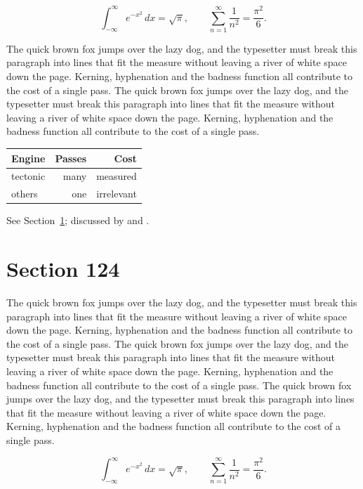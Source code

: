 \documentclass{article}
\begin{document}
\begin{equation}\label{eq:123}
\int_{-\infty}^{\infty} e^{-x^{2}}\,dx = \sqrt{\pi}, \qquad
\sum_{n=1}^{\infty} \frac{1}{n^{2}} = \frac{\pi^{2}}{6}.
\end{equation}

The quick brown fox jumps over the lazy dog, and the typesetter must break this paragraph into lines that fit the measure without leaving a river of white space down the page. Kerning, hyphenation and the badness function all contribute to the cost of a single pass. The quick brown fox jumps over the lazy dog, and the typesetter must break this paragraph into lines that fit the measure without leaving a river of white space down the page. Kerning, hyphenation and the badness function all contribute to the cost of a single pass. 

\begin{center}
\begin{tabular}{lrr}
\toprule
Engine & Passes & Cost \\
\midrule
tectonic & many & measured \\
others & one & irrelevant \\
\bottomrule
\end{tabular}
\end{center}

See Section~\ref{sec:124}; discussed by \textcite{k4} and \textcite{l1}.
\section{Section 124}
\label{sec:124}
The quick brown fox jumps over the lazy dog, and the typesetter must break this paragraph into lines that fit the measure without leaving a river of white space down the page. Kerning, hyphenation and the badness function all contribute to the cost of a single pass. The quick brown fox jumps over the lazy dog, and the typesetter must break this paragraph into lines that fit the measure without leaving a river of white space down the page. Kerning, hyphenation and the badness function all contribute to the cost of a single pass. The quick brown fox jumps over the lazy dog, and the typesetter must break this paragraph into lines that fit the measure without leaving a river of white space down the page. Kerning, hyphenation and the badness function all contribute to the cost of a single pass. 

\begin{equation}\label{eq:124}
\int_{-\infty}^{\infty} e^{-x^{2}}\,dx = \sqrt{\pi}, \qquad
\sum_{n=1}^{\infty} \frac{1}{n^{2}} = \frac{\pi^{2}}{6}.
\end{equation}
\end{document}
